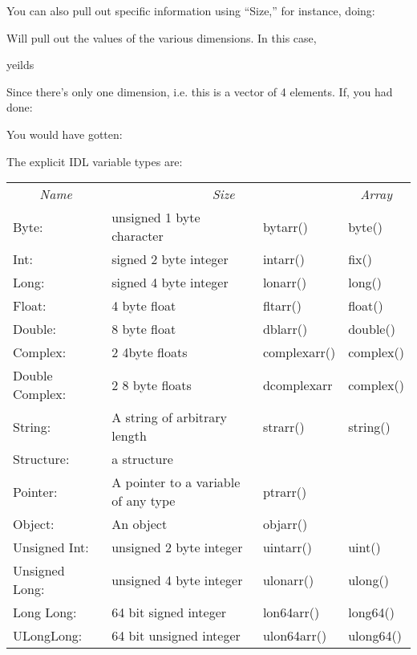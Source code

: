 \documentclass{article}
\begin{document}
   You can also pull out specific information using ``Size,'' for
   instance, doing:


   Will pull out the values of the various dimensions. In this case, 

   yeilds


    Since there's only one dimension, i.e. this is a vector of 4
    elements. If, you had done:


  You would have gotten:





   
   The explicit IDL variable types are:

    
   \begin{center}
   \begin{tabular}{l|l|l|l}\hline
   \multicolumn{1}{|c|}{\sl Name} &
   \multicolumn{2}{|c|}{\sl Size} &
   \multicolumn{3}{|c|}{\sl Array} &
   \multicolumn{4}{|c|}{\sl Cast} \\
	Byte: & unsigned 1 byte character & bytarr() & byte() \\
        Int: &  signed 2 byte integer & intarr() & fix() \\
        Long: & signed 4 byte integer & lonarr() & long() \\
        Float: & 4 byte float & fltarr() & float() \\
	Double: & 8 byte float & dblarr() & double() \\
	Complex: & 2 4byte floats & complexarr() & complex()\\
	Double Complex: & 2 8 byte floats & dcomplexarr & complex()\\
	String: & A string of arbitrary length & strarr() & string()\\
	\hline
	Structure: & a structure & & & \\
	Pointer: & A pointer to a variable of any type&ptrarr() &&\\
	Object: & An object & objarr() & & \\
	\hline
	Unsigned Int: & unsigned 2 byte integer & uintarr() & uint()\\
	Unsigned Long: & unsigned 4 byte integer & ulonarr() & ulong() \\
	Long Long: &64 bit signed integer & lon64arr() & long64() \\
	ULongLong: & 64 bit unsigned integer & ulon64arr() & ulong64()\\
	
   \end{tabular}
   \end{center}
\end{document}

